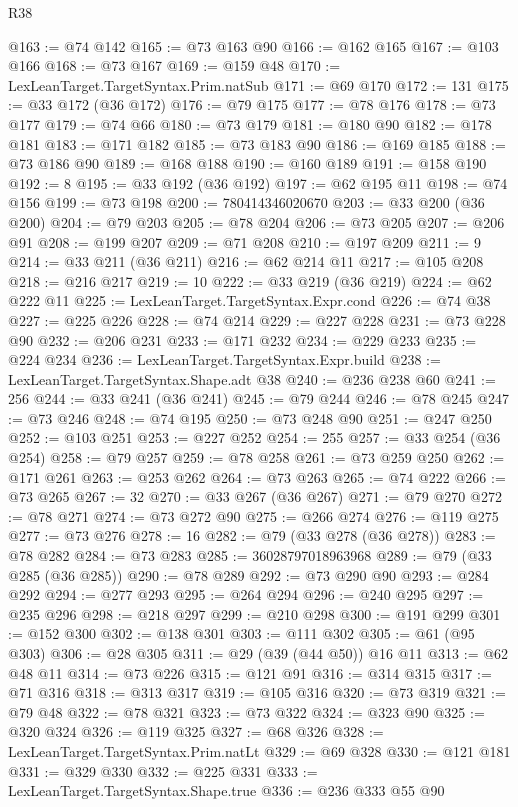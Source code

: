 \begin{lexlean}{R38}
\begin{coremodule}
@163 := @74 @142
@165 := @73 @163 @90
@166 := @162 @165
@167 := @103 @166
@168 := @73 @167
@169 := @159 @48
@170 := LexLeanTarget.TargetSyntax.Prim.natSub
@171 := @69 @170
@172 := 131
@175 := @33 @172 (@36 @172)
@176 := @79 @175
@177 := @78 @176
@178 := @73 @177
@179 := @74 @66
@180 := @73 @179
@181 := @180 @90
@182 := @178 @181
@183 := @171 @182
@185 := @73 @183 @90
@186 := @169 @185
@188 := @73 @186 @90
@189 := @168 @188
@190 := @160 @189
@191 := @158 @190
@192 := 8
@195 := @33 @192 (@36 @192)
@197 := @62 @195 @11
@198 := @74 @156
@199 := @73 @198
@200 := 780414346020670
@203 := @33 @200 (@36 @200)
@204 := @79 @203
@205 := @78 @204
@206 := @73 @205
@207 := @206 @91
@208 := @199 @207
@209 := @71 @208
@210 := @197 @209
@211 := 9
@214 := @33 @211 (@36 @211)
@216 := @62 @214 @11
@217 := @105 @208
@218 := @216 @217
@219 := 10
@222 := @33 @219 (@36 @219)
@224 := @62 @222 @11
@225 := LexLeanTarget.TargetSyntax.Expr.cond
@226 := @74 @38
@227 := @225 @226
@228 := @74 @214
@229 := @227 @228
@231 := @73 @228 @90
@232 := @206 @231
@233 := @171 @232
@234 := @229 @233
@235 := @224 @234
@236 := LexLeanTarget.TargetSyntax.Expr.build
@238 := LexLeanTarget.TargetSyntax.Shape.adt @38
@240 := @236 @238 @60
@241 := 256
@244 := @33 @241 (@36 @241)
@245 := @79 @244
@246 := @78 @245
@247 := @73 @246
@248 := @74 @195
@250 := @73 @248 @90
@251 := @247 @250
@252 := @103 @251
@253 := @227 @252
@254 := 255
@257 := @33 @254 (@36 @254)
@258 := @79 @257
@259 := @78 @258
@261 := @73 @259 @250
@262 := @171 @261
@263 := @253 @262
@264 := @73 @263
@265 := @74 @222
@266 := @73 @265
@267 := 32
@270 := @33 @267 (@36 @267)
@271 := @79 @270
@272 := @78 @271
@274 := @73 @272 @90
@275 := @266 @274
@276 := @119 @275
@277 := @73 @276
@278 := 16
@282 := @79 (@33 @278 (@36 @278))
@283 := @78 @282
@284 := @73 @283
@285 := 36028797018963968
@289 := @79 (@33 @285 (@36 @285))
@290 := @78 @289
@292 := @73 @290 @90
@293 := @284 @292
@294 := @277 @293
@295 := @264 @294
@296 := @240 @295
@297 := @235 @296
@298 := @218 @297
@299 := @210 @298
@300 := @191 @299
@301 := @152 @300
@302 := @138 @301
@303 := @111 @302
@305 := @61 (@95 @303)
@306 := @28 @305
@311 := @29 (@39 (@44 @50)) @16 @11
@313 := @62 @48 @11
@314 := @73 @226
@315 := @121 @91
@316 := @314 @315
@317 := @71 @316
@318 := @313 @317
@319 := @105 @316
@320 := @73 @319
@321 := @79 @48
@322 := @78 @321
@323 := @73 @322
@324 := @323 @90
@325 := @320 @324
@326 := @119 @325
@327 := @68 @326
@328 := LexLeanTarget.TargetSyntax.Prim.natLt
@329 := @69 @328
@330 := @121 @181
@331 := @329 @330
@332 := @225 @331
@333 := LexLeanTarget.TargetSyntax.Shape.true
@336 := @236 @333 @55 @90

\end{coremodule}
\end{lexlean}
